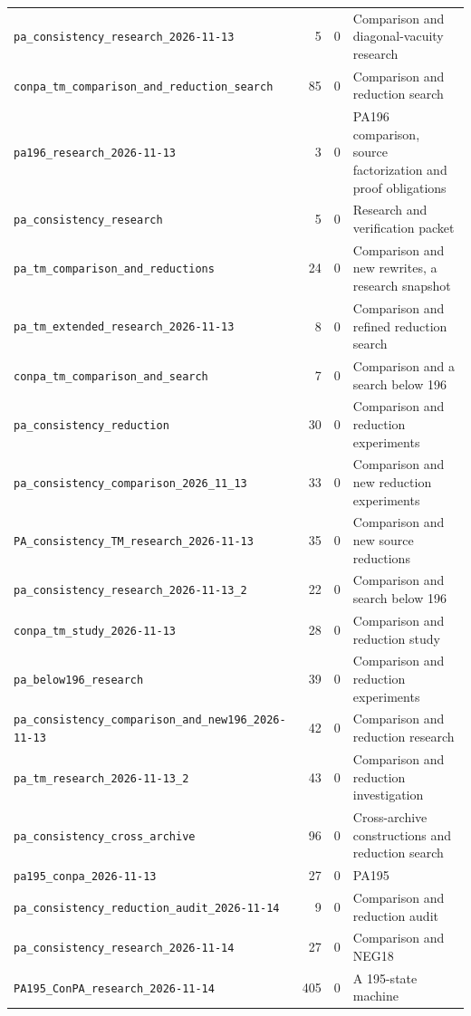 \begin{longtable}{@{}p{.39\linewidth}rrp{.43\linewidth}@{}}
\nolinkurl{pa_consistency_research_2026-11-13} & 5 & 0 & Comparison and diagonal-vacuity research \\
\nolinkurl{conpa_tm_comparison_and_reduction_search} & 85 & 0 & Comparison and reduction search \\
\nolinkurl{pa196_research_2026-11-13} & 3 & 0 & PA196 comparison, source factorization and proof obligations \\
\nolinkurl{pa_consistency_research} & 5 & 0 & Research and verification packet \\
\nolinkurl{pa_tm_comparison_and_reductions} & 24 & 0 & Comparison and new rewrites, a research snapshot \\
\nolinkurl{pa_tm_extended_research_2026-11-13} & 8 & 0 & Comparison and refined reduction search \\
\nolinkurl{conpa_tm_comparison_and_search} & 7 & 0 & Comparison and a search below 196 \\
\nolinkurl{pa_consistency_reduction} & 30 & 0 & Comparison and reduction experiments \\
\nolinkurl{pa_consistency_comparison_2026_11_13} & 33 & 0 & Comparison and new reduction experiments \\
\nolinkurl{PA_consistency_TM_research_2026-11-13} & 35 & 0 & Comparison and new source reductions \\
\nolinkurl{pa_consistency_research_2026-11-13_2} & 22 & 0 & Comparison and search below 196 \\
\nolinkurl{conpa_tm_study_2026-11-13} & 28 & 0 & Comparison and reduction study \\
\nolinkurl{pa_below196_research} & 39 & 0 & Comparison and reduction experiments \\
\nolinkurl{pa_consistency_comparison_and_new196_2026-11-13} & 42 & 0 & Comparison and reduction research \\
\nolinkurl{pa_tm_research_2026-11-13_2} & 43 & 0 & Comparison and reduction investigation \\
\nolinkurl{pa_consistency_cross_archive} & 96 & 0 & Cross-archive constructions and reduction search \\
\nolinkurl{pa195_conpa_2026-11-13} & 27 & 0 & PA195 \\
\nolinkurl{pa_consistency_reduction_audit_2026-11-14} & 9 & 0 & Comparison and reduction audit \\
\nolinkurl{pa_consistency_research_2026-11-14} & 27 & 0 & Comparison and NEG18 \\
\nolinkurl{PA195_ConPA_research_2026-11-14} & 405 & 0 & A 195-state machine \\

\end{longtable}
